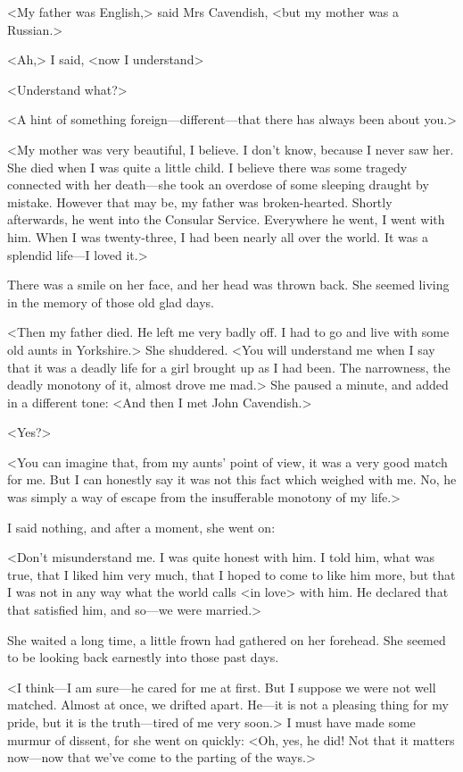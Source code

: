  <My father was English,> said Mrs Cavendish, <but my mother was a Russian.> 

 <Ah,> I said, <now I understand\longdash> 

 <Understand what?> 

 <A hint of something foreign—different—that there has always been about you.> 

 <My mother was very beautiful, I believe. I don't know, because I never saw her. She died when I was quite a little child. I believe there was some tragedy connected with her death—she took an overdose of some sleeping draught by mistake. However that may be, my father was broken-hearted. Shortly afterwards, he went into the Consular Service. Everywhere he went, I went with him. When I was twenty-three, I had been nearly all over the world. It was a splendid life—I loved it.> 

 There was a smile on her face, and her head was thrown back. She seemed living in the memory of those old glad days. 

 <Then my father died. He left me very badly off. I had to go and live with some old aunts in Yorkshire.> She shuddered. <You will understand me when I say that it was a deadly life for a girl brought up as I had been. The narrowness, the deadly monotony of it, almost drove me mad.> She paused a minute, and added in a different tone: <And then I met John Cavendish.> 

 <Yes?> 

 <You can imagine that, from my aunts' point of view, it was a very good match for me. But I can honestly say it was not this fact which weighed with me. No, he was simply a way of escape from the insufferable monotony of my life.> 

 I said nothing, and after a moment, she went on: 

 <Don't misunderstand me. I was quite honest with him. I told him, what was true, that I liked him very much, that I hoped to come to like him more, but that I was not in any way what the world calls <in love> with him. He declared that that satisfied him, and so—we were married.> 

 She waited a long time, a little frown had gathered on her forehead. She seemed to be looking back earnestly into those past days. 

 <I think—I am sure—he cared for me at first. But I suppose we were not well matched. Almost at once, we drifted apart. He—it is not a pleasing thing for my pride, but it is the truth—tired of me very soon.> I must have made some murmur of dissent, for she went on quickly: <Oh, yes, he did! Not that it matters now—now that we've come to the parting of the ways.> 

